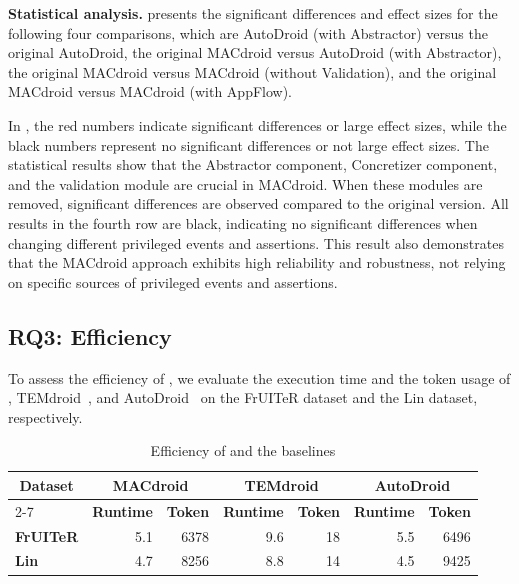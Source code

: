 \textbf{Statistical analysis.}  presents the significant differences and effect sizes for the following four comparisons, which are AutoDroid (with Abstractor) versus the original AutoDroid, the original MACdroid versus AutoDroid (with Abstractor), the original MACdroid versus MACdroid (without Validation), and the original MACdroid versus MACdroid (with AppFlow).



In , the red numbers indicate significant differences or large effect sizes, while the black numbers represent no significant differences or not large effect sizes. The statistical results show that the Abstractor component, Concretizer component, and the validation module are crucial in MACdroid. When these modules are removed, significant differences are observed compared to the original version. All results in the fourth row are black, indicating no significant differences when changing different privileged events and assertions. This result also demonstrates that the MACdroid approach exhibits high reliability and robustness, not relying on specific sources of privileged events and assertions.





\subsection{RQ3: Efficiency}

To assess the efficiency of \toolNameSmall{}, we evaluate the execution time and the token usage of \toolNameSmall{}, TEMdroid~\cite{zhang2024learning}, and AutoDroid~\cite{wen2023empowering} on the FrUITeR dataset and the Lin dataset, respectively.


\begin{table}[t]
  \centering
  \caption{Efficiency of \toolNameSmall{} and the baselines}
    \begin{tabular}{l|r|r|r|r|r|r}
    \toprule
    \multicolumn{1}{c|}{\multirow{2}[4]{*}{\textbf{Dataset}}} & \multicolumn{2}{c|}{\textbf{MACdroid}} & \multicolumn{2}{c|}{\textbf{TEMdroid}} & \multicolumn{2}{c}{\textbf{AutoDroid}} \\
\cmidrule{2-7}          & \multicolumn{1}{l|}{\textbf{Runtime}} & \multicolumn{1}{l|}{\textbf{Token}} & \multicolumn{1}{l|}{\textbf{Runtime}} & \textbf{Token} & \multicolumn{1}{l|}{\textbf{Runtime}} & \multicolumn{1}{l}{\textbf{Token}} \\
    \midrule
    \textbf{FrUITeR} & 5.1   & 6378  & 9.6   & 18     & 5.5   & 6496 \\
    \textbf{Lin} & 4.7   & 8256  & 8.8   & 14     & 4.5   & 9425 \\
    \bottomrule
    \end{tabular}%
  \label{tab:runtime-information}%
\end{table}%




